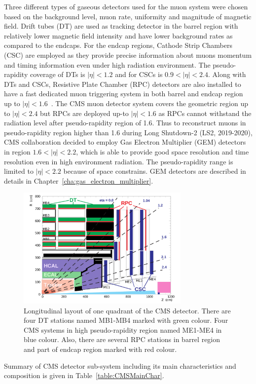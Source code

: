 Three different types of gaseous detectors used for the muon system  were chosen based on the background level, muon rate, uniformity and magnitude of magnetic field.
Drift tubes (DT) are used as tracking detector in the barrel region with relatively lower magnetic field intensity and have lower background rates as compared to the endcaps. 
For the endcap regions, Cathode Strip Chambers (CSC) are employed as they provide precise information about muons momentum and timing information even under high radiation environment.
The pseudo-rapidity coverage of DTs is $|\eta|<1.2$ and for CSCs is $0.9<|\eta|<2.4$. Along with DTs and CSCs, Resistive Plate Chamber (RPC) detectors are also installed to have a fast dedicated  muon triggering system in both barrel and endcap region up to $|\eta|<1.6$~\cite{muon-tdr}. The CMS muon detector system covers the geometric region up to $|\eta|<2.4$ but RPCs are deployed up-to $|\eta|<1.6$ as RPCs cannot withstand the radiation level after pseudo-rapidity region of 1.6. Thus to reconstruct muons in pseudo-rapidity region higher than 1.6 during Long Shutdown-2 (LS2, 2019-2020), CMS collaboration decided to employ Gas Electron Multiplier (GEM) detectors in region  $1.6<|\eta|<2.2$, which is able to provide good space resolution and time resolution even in high environment radiation. The pseudo-rapidity range is limited to $|\eta|<2.2$ because of space constrains. GEM  detectors are described in details in Chapter~\ref{cha:gas_electron_multiplier}.
\begin{figure}[!htbp]
	\centering
	\includegraphics[width=0.75\textwidth]{figures/LHC/pictures_MuonSys-mod3.pdf}
	\caption{Longitudinal layout of one quadrant of the CMS detector. There are four DT stations named MB1-MB4 marked with green colour. Four CMS systems in high pseudo-rapidity region named ME1-ME4 in blue colour. Also, there are several RPC stations in barrel region and part of endcap region marked with red colour.}
	\label{fig:muon-system-layout}
\end{figure}
Summary of CMS detector sub-system including its main characteristics and composition is given in Table~\ref{table:CMSMainChar}.

